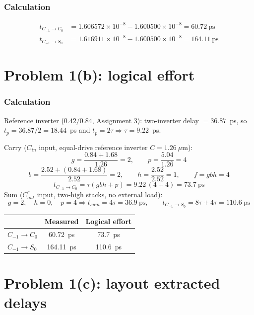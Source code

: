 \subsubsection{Calculation}

\[
\begin{aligned}
t_{C_{-1}\to C_0} &= 1.606572\times10^{-8} - 1.600500\times10^{-8} = 60.72\ \text{ps} \\
t_{C_{-1}\to S_0} &= 1.616911\times10^{-8} - 1.600500\times10^{-8} = 164.11\ \text{ps}
\end{aligned}
\]

\section{Problem 1(b): logical effort}

\subsubsection{Calculation}

Reference inverter ($0.42/0.84$, Assignment 3): two-inverter delay $=36.87$~ps, so
$t_p = 36.87/2 = 18.44$~ps and $t_p = 2\tau \Rightarrow \tau = 9.22$~ps.

Carry ($C_{in}$ input, equal-drive reference inverter $C=1.26\ \mu$m):
\[
g = \frac{0.84+1.68}{1.26} = 2, \qquad p = \frac{5.04}{1.26} = 4
\]
\[
b = \frac{2.52 + (0.84+1.68)}{2.52} = 2, \qquad h = \frac{2.52}{2.52} = 1, \qquad f = gbh = 4
\]
\[
t_{C_{-1}\to C_0} = \tau(gbh+p) = 9.22\,(4+4) = 73.7\ \text{ps}
\]
Sum ($\overline{C_{out}}$ input, two-high stacks, no external load):
\[
g = 2, \quad h = 0, \quad p = 4 \Rightarrow t_{sum} = 4\tau = 36.9\ \text{ps}, \qquad
t_{C_{-1}\to S_0} = 8\tau + 4\tau = 110.6\ \text{ps}
\]

\begin{center}
\begin{tabular}{lcc}
\hline
 & Measured & Logical effort \\
\hline
$C_{-1}\to C_0$ & 60.72~ps & 73.7~ps \\
$C_{-1}\to S_0$ & 164.11~ps & 110.6~ps \\
\hline
\end{tabular}
\end{center}

\section{Problem 1(c): layout extracted delays}

